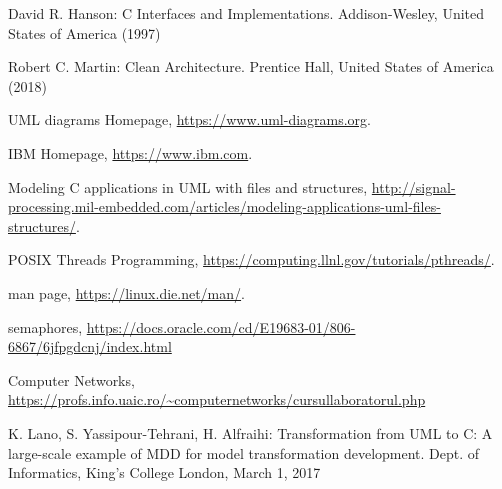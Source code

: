 \documentclass[runningheads]{llncs}
\begin{document}
%
%
%
% 
% 
%
\begin{thebibliography}{8}
David R. Hanson: C Interfaces and Implementations. Addison-Wesley,
United States of America (1997)

Robert C. Martin: Clean Architecture. Prentice Hall,
United States of America (2018)

UML diagrams Homepage, \url{https://www.uml-diagrams.org}.


IBM Homepage, \url{https://www.ibm.com}.

Modeling C applications in UML with files and structures, \url{http://signal-processing.mil-embedded.com/articles/modeling-applications-uml-files-structures/}.

POSIX Threads Programming, \url{https://computing.llnl.gov/tutorials/pthreads/}.

man page, \url{https://linux.die.net/man/}.

semaphores, \url{https://docs.oracle.com/cd/E19683-01/806-6867/6jfpgdcnj/index.html}

Computer Networks, \url{https://profs.info.uaic.ro/~computernetworks/cursullaboratorul.php}

K. Lano, S. Yassipour-Tehrani, H. Alfraihi: Transformation from UML to C: A large-scale example of MDD for model transformation development. Dept. of Informatics, King's College London, March 1, 2017


\end{thebibliography}
\end{document}
